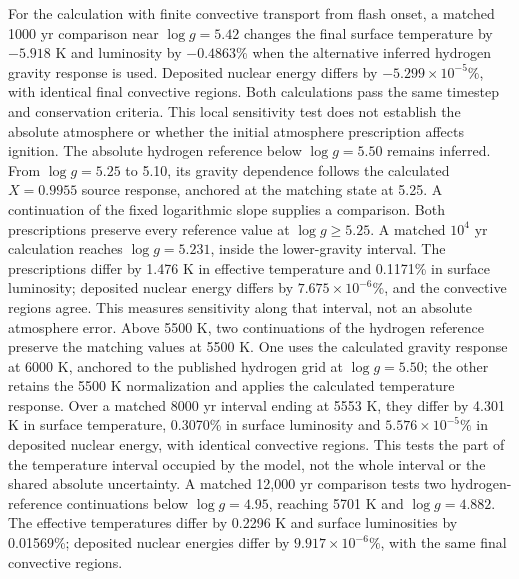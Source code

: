 \documentclass[11pt,letterpaper]{article}
\begin{document}
For the calculation with finite convective transport from flash onset,
a matched 1000 yr comparison near $\log g=5.42$ changes the final surface
temperature by $-5.918$ K and luminosity by $-0.4863\%$ when the alternative
inferred hydrogen gravity response is used. Deposited nuclear energy differs
by $-5.299\times10^{-5}\%$, with identical final convective regions.
Both calculations pass the same timestep and conservation criteria.
This local sensitivity test does not establish the absolute atmosphere
or whether the initial atmosphere prescription affects ignition.
The absolute hydrogen reference below $\log g=5.50$ remains inferred.
From $\log g=5.25$ to 5.10, its gravity dependence follows the calculated
$X=0.9955$ source response, anchored at the matching state at 5.25.
A continuation of the fixed logarithmic slope supplies a comparison.
Both prescriptions preserve every reference value at $\log g\geq5.25$.
A matched $10^4$ yr calculation reaches $\log g=5.231$, inside the
lower-gravity interval. The prescriptions differ by 1.476 K in effective
temperature and 0.1171\% in surface luminosity; deposited nuclear energy
differs by $7.675\times10^{-6}\%$, and the convective regions agree.
This measures sensitivity along that interval, not an absolute atmosphere error.
Above 5500 K, two continuations of the hydrogen reference preserve the
matching values at 5500 K. One uses the calculated gravity response at 6000 K,
anchored to the published hydrogen grid at $\log g=5.50$; the other retains
the 5500 K normalization and applies the calculated temperature response.
Over a matched 8000 yr interval ending at 5553 K, they differ by 4.301 K
in surface temperature, 0.3070\% in surface luminosity and
$5.576\times10^{-5}\%$ in deposited nuclear energy, with identical convective
regions. This tests the part of the temperature interval occupied by the
model, not the whole interval or the shared absolute uncertainty.
A matched 12,000 yr comparison tests two hydrogen-reference continuations
below $\log g=4.95$, reaching 5701 K and $\log g=4.882$.
The effective temperatures differ by 0.2296 K and surface luminosities by
0.01569\%; deposited nuclear energies differ by $9.917\times10^{-6}\%$,
with the same final convective regions.
\end{document}
